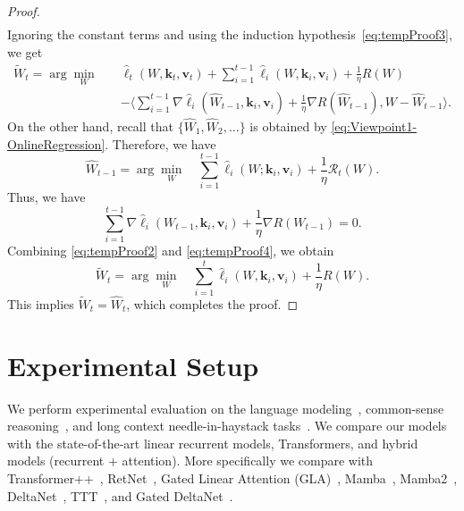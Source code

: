 \documentclass{article}
\newcommand{\citep}{\parencite}
\newcommand{\vk}[0]{\mathbf{k}}
\newcommand{\vvv}[0]{\mathbf{v}}
\theoremstyle{plain}
\theoremstyle{definition}
\theoremstyle{remark}
\begin{document}
\begin{proof}
\begin{equation}
\begin{split}
\end{split}
\end{equation}
Ignoring the constant terms and using the induction hypothesis~\eqref{eq:tempProof3}, we get 
\begin{equation}
\label{eq:tempProof4}
\begin{split}
 \widetilde{W}_{t} = \arg\min_{W} \quad &\widehat{\ell}_t (W,\vk_t,\vvv_t) + \sum_{i=1}^{t-1} \widehat{\ell}_i (W,\vk_i,\vvv_i) + \frac{1}{\eta} R(W) \\
    & - \Bigg\langle \sum_{i=1}^{t-1} \nabla \widehat{\ell}_i (\widehat{W}_{t-1}, \vk_i,\vvv_i) + \frac{1}{\eta} \nabla R(\widehat{W}_{t-1}), W - \widehat{W}_{t-1} \Bigg\rangle.
\end{split}
\end{equation}
On the other hand, recall that $\{\widehat{W}_1,\widehat{W}_2,\ldots\}$ is obtained by \eqref{eq:Viewpoint1-OnlineRegression}. Therefore, we have
\[
\widehat{W}_{t-1} = \arg\min_{W}\quad \sum_{i=1}^{t-1} \widehat{\ell}_i(W;\vk_i, \vvv_i)  + \frac{1}{\eta} \mathcal{R}_t(W).
\]
Thus,  we have
\begin{equation}
\label{eq:tempProof2}
    \sum_{i=1}^{t-1} \nabla \widehat{\ell}_i (W_{t-1}, \vk_i,\vvv_i) + \frac{1}{\eta} \nabla R(W_{t-1}) = 0.
\end{equation}
Combining \eqref{eq:tempProof2} and \eqref{eq:tempProof4}, we obtain
\[
\widetilde{W}_{t} = \arg\min_{W} \quad  \sum_{i=1}^{t} \widehat{\ell}_i (W,\vk_i,\vvv_i) + \frac{1}{\eta} R(W).
\]
This implies $\widetilde{W}_t = \widehat{W}_t$, which completes the proof.
\end{proof}

\section{Experimental Setup}\label{app:exp-details}
We perform experimental evaluation on the language modeling~\citep{merity2017pointer, paperno-etal-2016-lambada}, common-sense reasoning~\citep{bisk2020piqa, zellers-etal-2019-hellaswag, sakaguchi2021winogrande,clark2018think, clark-etal-2019-boolq}, and long context needle-in-haystack tasks~\citep{hsieh2024ruler}. We compare our models with the state-of-the-art linear recurrent models, Transformers, and hybrid models (recurrent + attention). More specifically we compare with Transformer++~\citep{touvron2023llama}, RetNet~\citep{sun2023retentive}, Gated Linear Attention (GLA)~\citep{yang2024gatedattn}, Mamba~\citep{gu2024mamba}, Mamba2~\citep{dao2024transformers}, DeltaNet~\citep{yang2024parallelizing}, TTT~\citep{sun2024learning}, and Gated DeltaNet~\citep{yang2024gated}. 
\end{document}

